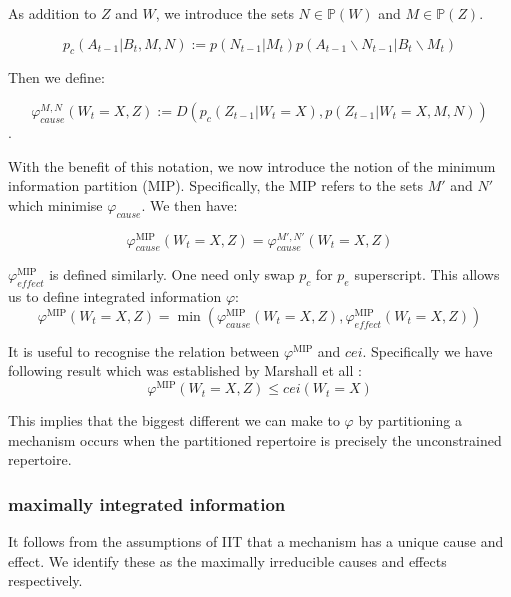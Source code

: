 As addition to $Z$ and $W$, we introduce the sets $N \in \mathbb{P}(W)$ and $M \in \mathbb{P}(Z)$.

\begin{equation}
\label{def:preMIP}
p_c(A_{t-1}|B_t ,M, N):= p(N_{t-1}|M_t) p(A_{t-1} \backslash N_{t-1} |B_t \backslash M_t)
\end{equation}

Then we define:

\begin{equation}
\label{def:phi2}
\varphi_{cause}^{M,N}(W_t=X, Z) := D \left( p_c(Z_{t-1}|W_t=X) ,p(Z_{t-1}|W_{t} = X,M,N)  \right)
\end{equation}.

With the benefit of this notation, we now introduce the notion of the minimum information partition (MIP). Specifically, the MIP refers to the sets $M'$ and $N'$ which minimise $\varphi_{cause}$. We then have:

\begin{equation}
\label{def:phi3}
\varphi_{cause}^{\text{MIP}}(W_t=X, Z)  = \varphi_{cause}^{M',N'}(W_t=X, Z) 
\end{equation}

$\varphi^{\text{MIP}}_{effect}$ is defined similarly. One need only swap $p_c$ for $p_e$ superscript. This allows us to define integrated information $\varphi$:
\begin{equation}
\label{def:phi}
\varphi^{\text{MIP}}(W_t=X, Z) = \min \left( \varphi_{cause}^{\text{MIP}}(W_t=X, Z), \varphi_{effect}^{\text{MIP}}(W_t=X, Z)  \right) 
\end{equation}



It is useful to recognise the relation between $\varphi^{\text{MIP}}$ and $cei$. Specifically we have following result which was established by Marshall et all \cite{marshall2016integrated}:
\begin{equation}
\label{eq:bound_phi_cei}
\varphi^{\text{MIP}}(W_t=X, Z) \leq cei(W_t=X) 
\end{equation}

This implies that the biggest different we can make to $\varphi$ by partitioning a mechanism occurs when the partitioned repertoire is precisely the unconstrained repertoire. 



\subsubsection{maximally integrated information}
It follows from the assumptions of IIT that a mechanism has a unique cause and effect. We identify these as the maximally irreducible causes and effects respectively. 

